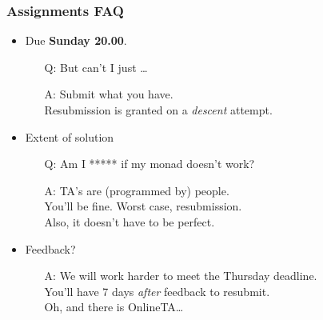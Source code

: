 \begin{frame}

\frametitle{Assignments FAQ}

\begin{itemize}

\pause

\item Due \textbf{Sunday 20.00}.

\begin{itemize}

\item[Q:] But can't I just \ldots

\item[A:] Submit what you have.\\ Resubmission is granted on a \emph{descent} attempt.

\end{itemize}

\pause

\item Extent of solution

\begin{itemize}

\item[Q:] Am I ***** if my monad doesn't work?

\item[A:] TA's are (programmed by) people. \\ You'll be fine. Worst case,
resubmission. \\ Also, it doesn't have to be perfect.

\end{itemize}

\pause

\item Feedback?

\begin{itemize}

\item[A:] We will work harder to meet the Thursday deadline. \\ You'll have 7
days \emph{after} feedback to resubmit. \\ Oh, and there is OnlineTA\ldots

\end{itemize}

\end{itemize}

\end{frame}
